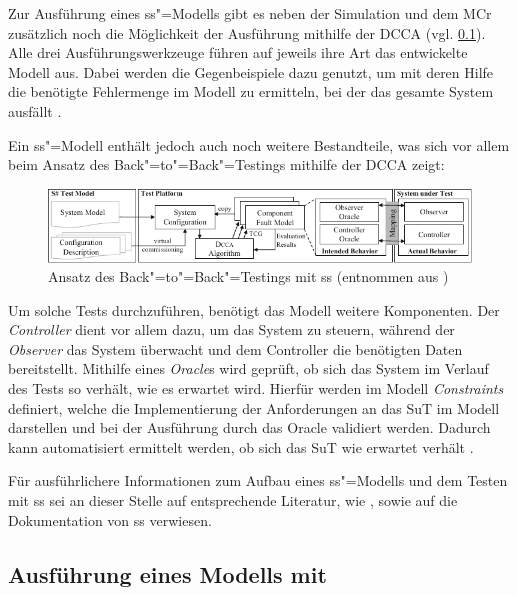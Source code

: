 Zur Ausführung eines \gls{ss}"=Modells gibt es neben der Simulation und dem \gls{MCr} zusätzlich noch die Möglichkeit der Ausführung mithilfe der \gls{DCCA} (vgl. \cref{subsec:ssharpExecution}).
Alle drei Ausführungswerkzeuge führen auf jeweils ihre Art das entwickelte Modell aus.
Dabei werden die Gegenbeispiele dazu genutzt, um mit deren Hilfe die benötigte Fehlermenge im Modell zu ermitteln, bei der das gesamte System ausfällt \cite{Habermaier2016}.

Ein \gls{ss}"=Modell enthält jedoch auch noch weitere Bestandteile, was sich vor allem beim Ansatz des Back"=to"=Back"=Testings mithilfe der \gls{DCCA} zeigt:

\begin{figure}[h]
    \includegraphics[width=\columnwidth]{./resources/b2bTestApproach.pdf}
    \caption[Ansatz des Back"=to"=Back"=Testings mit ]
    {Ansatz des Back"=to"=Back"=Testings mit \gls{ss} (entnommen aus \cite{Eberhardinger2016})}
    \label{fig:ssharpB2BTesting}
\end{figure}

Um solche Tests durchzuführen, benötigt das Modell weitere Komponenten.
Der \emph{Controller} dient vor allem dazu, um das System zu steuern, während der \emph{Observer} das System überwacht und dem Controller die benötigten Daten bereitstellt.
Mithilfe eines \emph{Oracle}s wird geprüft, ob sich das System im Verlauf des Tests so verhält, wie es erwartet wird.
Hierfür werden im Modell \emph{Constraints} definiert, welche die Implementierung der Anforderungen an das \gls{SuT} im Modell darstellen und bei der Ausführung durch das Oracle validiert werden.
Dadurch kann automatisiert ermittelt werden, ob sich das \gls{SuT} wie erwartet verhält \cite{Eberhardinger2016,Habermaier2015}.

Für ausführlichere Informationen zum Aufbau eines \gls{ss}"=Modells und dem Testen mit \gls{ss} sei an dieser Stelle auf entsprechende Literatur, wie \zB \cite{Eberhardinger2016,Habermaier2015,Habermaier2016}, sowie auf die Dokumentation von \gls{ss} \cite{SSWiki} verwiesen.

\subsection{Ausführung eines Modells mit }
\label{subsec:ssharpExecution}


